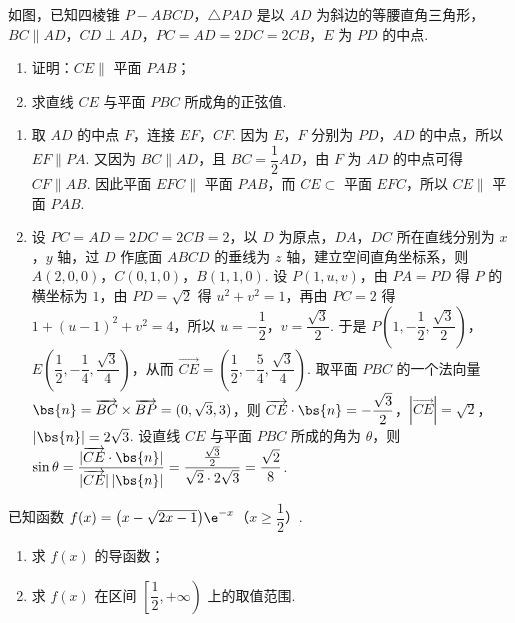\begin{problem}
如图，已知四棱锥 \(P-ABCD\)，\(\triangle PAD\) 是以 \(AD\) 为斜边的等腰直角三角形，\(BC\parallel AD\)，\(CD\perp AD\)，\(PC=AD=2DC=2CB\)，\(E\) 为 \(PD\) 的中点.

\begin{enumerate}
\item 证明：\(CE\parallel\) 平面 \(PAB\)；
\item 求直线 \(CE\) 与平面 \(PBC\) 所成角的正弦值.
\end{enumerate}

\begin{center}
\end{center}
\end{problem}

\begin{solution}
\begin{enumerate}
\item 取 \(AD\) 的中点 \(F\)，连接 \(EF\)，\(CF\). 因为 \(E\)，\(F\) 分别为 \(PD\)，\(AD\) 的中点，所以 \(EF\parallel PA\). 又因为 \(BC\parallel AD\)，且 \(BC=\dfrac{1}{2}AD\)，由 \(F\) 为 \(AD\) 的中点可得 \(CF\parallel AB\). 因此平面 \(EFC\parallel\) 平面 \(PAB\)，而 \(CE\subset\) 平面 \(EFC\)，所以 \(CE\parallel\) 平面 \(PAB\).
\item 设 \(PC=AD=2DC=2CB=2\)，以 \(D\) 为原点，\(DA\)，\(DC\) 所在直线分别为 \(x\)，\(y\) 轴，过 \(D\) 作底面 \(ABCD\) 的垂线为 \(z\) 轴，建立空间直角坐标系，则 \(A(2,0,0)\)，\(C(0,1,0)\)，\(B(1,1,0)\). 设 \(P(1,u,v)\)，由 \(PA=PD\) 得 \(P\) 的横坐标为 \(1\)，由 \(PD=\sqrt{2}\) 得 \(u^2+v^2=1\)，再由 \(PC=2\) 得 \(1+(u-1)^2+v^2=4\)，所以 \(u=-\dfrac{1}{2}\)，\(v=\dfrac{\sqrt{3}}{2}\). 于是 \(P\left(1,-\dfrac{1}{2},\dfrac{\sqrt{3}}{2}\right)\)，\(E\left(\dfrac{1}{2},-\dfrac{1}{4},\dfrac{\sqrt{3}}{4}\right)\)，从而 \(\overrightarrow{CE}=\left(\dfrac{1}{2},-\dfrac{5}{4},\dfrac{\sqrt{3}}{4}\right)\). 取平面 \(PBC\) 的一个法向量 \(\bs{n}=\overrightarrow{BC}\times\overrightarrow{BP}=(0,\sqrt{3},3)\)，则 \(\overrightarrow{CE}\cdot\bs{n}=-\dfrac{\sqrt{3}}{2}\)，\(|\overrightarrow{CE}|=\sqrt{2}\)，\(|\bs{n}|=2\sqrt{3}\). 设直线 \(CE\) 与平面 \(PBC\) 所成的角为 \(\theta\)，则 \(\sin\theta=\dfrac{|\overrightarrow{CE}\cdot\bs{n}|}{|\overrightarrow{CE}|\,|\bs{n}|}=\dfrac{\frac{\sqrt{3}}{2}}{\sqrt{2}\cdot2\sqrt{3}}=\dfrac{\sqrt{2}}{8}\).
\end{enumerate}
\end{solution}

\begin{problem}
已知函数 \(f(x)=\bigl(x-\sqrt{2x-1}\bigr)\e^{-x}\)（\(x\ge\dfrac12\)）.

\begin{enumerate}
\item 求 \(f(x)\) 的导函数；
\item 求 \(f(x)\) 在区间 \(\left[\dfrac12,+\infty\right)\) 上的取值范围.
\end{enumerate}
\end{problem}

